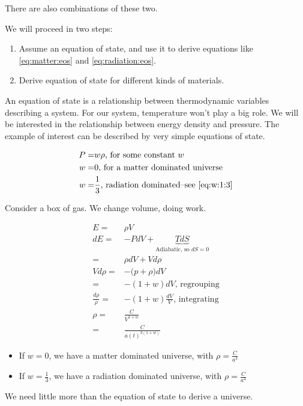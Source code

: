 \documentclass[]{article}
\begin{document}
There are also combinations of these two.

We will proceed in two steps:
\begin{enumerate}
	\item Assume an equation of state, and use it to derive equations like \eqref{eq:matter:eos} and \eqref{eq:radiation:eos}.
	\item Derive equation of state for different kinds of materials.
\end{enumerate}

An equation of state is a relationship between thermodynamic variables describing a system. For our system, temperature won't play a big role. We will be interested in the relationship between energy density and pressure. The example of interest can be described by very simple equations of state.

\begin{align*}
	P =& w \rho\text{, for some constant $w$}\\
	w =& 0 \text {, for a matter dominated universe}\\
	w =& \frac{1}{3} \text{, radiation dominated--see \eqref{eq:w:1:3}}
\end{align*}

Consider a box of gas. We change volume, doing work.

\begin{align*}
	E =& \rho V\\
	dE =& -P dV + \underbrace{T dS}_\text{Adiabatic, so $dS=0$}\\
	=& \rho dV + V d\rho\\
	V d\rho =& -\big(p+\rho\big)dV\\
	=& - (1+w)dV \text{, regrouping}\\
	\frac{d\rho}{\rho} =& - (1+w)\frac{dV}{V} \text{, integrating}\\
	\rho =& \frac{C}{V^{1+w}}\\
	=& \frac{C}{a(t)^{3(1+w)}}
\end{align*}

\begin{itemize}
	\item If $w=0$, we have a matter dominated universe, with $\rho=\frac{C}{a^3}$
	\item If $w=\frac{1}{3}$, we have a radiation  dominated universe, with $\rho=\frac{C}{a^4}$
\end{itemize}

We need little more than the equation of state to derive a universe.
\end{document}
